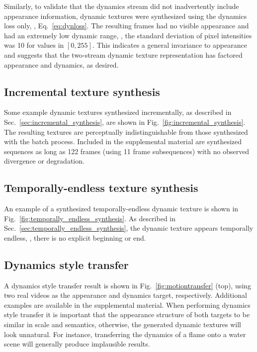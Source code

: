 Similarly, to validate that the dynamics stream did not 
inadvertently include appearance information, dynamic textures were synthesized
using the dynamics loss only, \ie, Eq.\ \ref{eq:dynloss}.
The resulting frames had no visible appearance and had
an extremely low dynamic range, \ie, the standard
deviation of pixel intensities was 10 for values in $[0,255]$. 
This indicates a general invariance to appearance and 
suggests that the two-stream dynamic texture representation
has factored appearance and dynamics, as desired.



\subsection{Incremental texture synthesis}

Some example dynamic textures synthesized incrementally, as described in Sec.\ \ref{sec:incremental_synthesis}, are shown in Fig.\ \ref{fig:incremental_synthesis}. 
The resulting textures are perceptually indistinguishable from those
synthesized with the batch process. Included in the supplemental material are synthesized sequences as long as 122 frames (using 11 frame subsequences) with no observed divergence or degradation.

\subsection{Temporally-endless texture synthesis}

An example of a synthesized temporally-endless dynamic texture is shown in
Fig.\ \ref{fig:temporally_endless_synthesis}. As described in Sec.\ 
\ref{sec:temporally_endless_synthesis}, the dynamic texture appears
temporally endless, \ie, there is no explicit beginning or end.

\subsection{Dynamics style transfer}

A dynamics style transfer result is shown in Fig.\ 
\ref{fig:motiontransfer} (top), using two real videos as the appearance and dynamics target, respectively.
Additional examples are available in the supplemental material. 
When performing dynamics style transfer it is important
that the appearance structure of both targets to be similar in scale and semantics,
otherwise, the generated dynamic textures will look unnatural.
For instance, transferring the dynamics of a flame onto a water 
scene will generally produce implausible results. 

